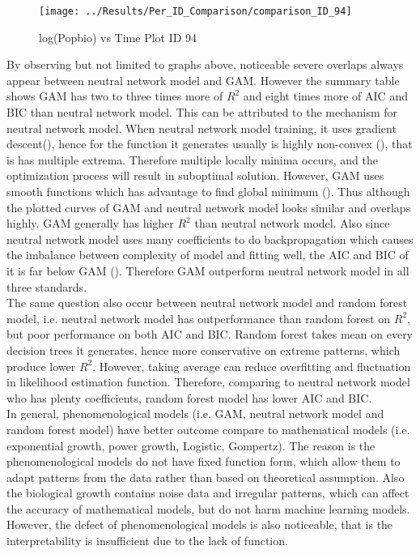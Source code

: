 \documentclass[11pt]{article}
\begin{document}
\begin{figure}[H]
    \centering
    \texttt{[image: ../Results/Per\_ID\_Comparison/comparison\_ID\_94]} 
    \caption{log(Popbio) vs Time Plot ID 94}
    \label{fig:scatter6}
\end{figure}

\noindent By observing but not limited to graphs above, noticeable severe overlaps always appear between neutral network model and GAM. However the summary table shows GAM has two to three times more of $R^2$ and eight times more of AIC and BIC than neutral network model. This can be attributed to the mechanism for neutral network model. When neutral network model training, it uses gradient descent(\cite{bishop1995neural}), hence for the function it generates usually is highly non-convex (\cite{goodfellow2016deep}), that is has multiple extrema. Therefore multiple locally minima occurs, and the optimization process will result in suboptimal solution. However, GAM uses smooth functions which has advantage to find global minimum (\cite{wood2017gam}). Thus although the plotted curves of GAM and neutral network model looks similar and overlaps highly. GAM generally has higher $R^2$ than neutral network model. Also since neutral network model uses many coefficients to do backpropagation which causes the imbalance between complexity of model and fitting well, the AIC and BIC of it is far below GAM (\cite{hastie2009elements}). Therefore GAM outperform neutral network model in all three standards. \\

\noindent The same question also occur between neutral network model and random forest model, i.e. neutral network model has outperformance than random forest on $R^2$, but poor performance on both AIC and BIC. Random forest takes mean on every decision trees it generates, hence more conservative on extreme patterns, which produce lower $R^2$. However, taking average can reduce overfitting and fluctuation in likelihood estimation function. Therefore, comparing to neutral network model who has plenty coefficients, random forest model has lower AIC and BIC.\\

\noindent In general, phenomenological models (i.e. GAM, neutral network model and random forest model) have better outcome compare to mathematical models (i.e. exponential growth, power growth, Logistic, Gompertz). The reason is the phenomenological models do not have fixed function form, which allow them to adapt patterns from the data rather than based on theoretical assumption. Also the biological growth contains noise data and irregular patterns, which can affect the accuracy of mathematical models, but do not harm machine learning models. However, the defect of phenomenological models is also noticeable, that is the interpretability is insufficient due to the lack of function.\\
\end{document}
